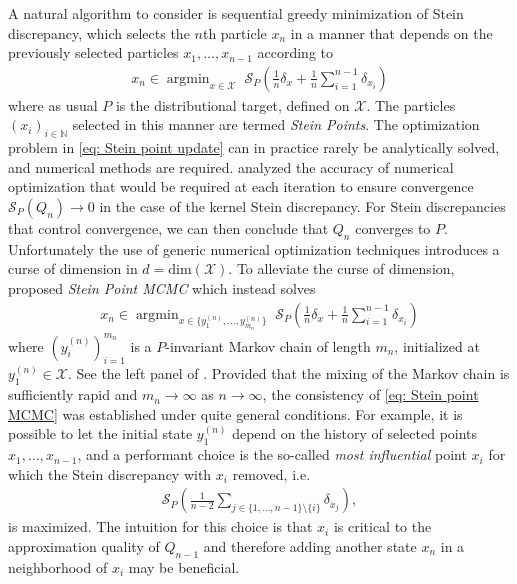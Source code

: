 \documentclass[12pt,paper=letter]{scrreprt}
\providecommand{\argmin}{\mathop\mathrm{arg min}}
\begin{document}
A natural algorithm to consider is sequential greedy minimization of Stein discrepancy, which selects the $n$th particle $x_n$ in a manner that depends on the previously selected particles $x_1, \dots , x_{n-1}$ according to
\begin{align}
x_n \in \argmin_{x \in \mathcal{X}} \; \mathcal{S}_P\left( \frac{1}{n} \delta_x + \frac{1}{n} \sum_{i=1}^{n-1} \delta_{x_i} \right)   \label{eq: Stein point update}
\end{align}
where as usual $P$ is the distributional target, defined on $\mathcal{X}$.
The particles $(x_i)_{i \in \mathbb{N}}$ selected in this manner are termed \emph{Stein Points}.
The optimization problem in \eqref{eq: Stein point update} can in practice rarely be analytically solved, and numerical methods are required.
\citet{chen2018stein} analyzed the accuracy of numerical optimization that would be required at each iteration to ensure convergence $\mathcal{S}_P(Q_n) \rightarrow 0$ in the case of the kernel Stein discrepancy.
For Stein discrepancies that control convergence, we can then conclude that $Q_n$ converges to $P$.
Unfortunately the use of generic numerical optimization techniques introduces a curse of dimension in $d = \mathrm{dim}(\mathcal{X})$.
To alleviate the curse of dimension, \citet{chen2019stein} proposed \emph{Stein Point MCMC} which instead solves 
\begin{align}
x_n \in \argmin_{x \in \{y_1^{(n)} , \dots , y_{m_n}^{(n)}\}} \; \mathcal{S}_P\left( \frac{1}{n} \delta_x + \frac{1}{n} \sum_{i=1}^{n-1} \delta_{x_i} \right)   \label{eq: Stein point MCMC}
\end{align}
where $(y_i^{(n)})_{i = 1}^{m_n}$ is a $P$-invariant Markov chain of length $m_n$,  initialized at $y_1^{(n)} \in \mathcal{X}$.
See the left panel of .
Provided that the mixing of the Markov chain is sufficiently rapid and $m_n \rightarrow \infty$ as $n \rightarrow \infty$, the consistency of \eqref{eq: Stein point MCMC} was established under quite general conditions.
For example, it is possible to let the initial state $y_1^{(n)}$ depend on the history of selected points $x_1, \dots , x_{n-1}$, and a performant choice is the so-called \emph{most influential} point $x_i$ for which the Stein discrepancy with $x_i$ removed, i.e.
\begin{align*}
    \mathcal{S}_P\left( \frac{1}{n-2} \sum_{j \in \{1,\dots,n-1\} \setminus \{i\}} \delta_{x_j} \right) ,
\end{align*}
is maximized.
The intuition for this choice is that $x_i$ is critical to the approximation quality of $Q_{n-1}$ and therefore adding another state $x_n$ in a neighborhood of $x_i$ may be beneficial.
\end{document}
